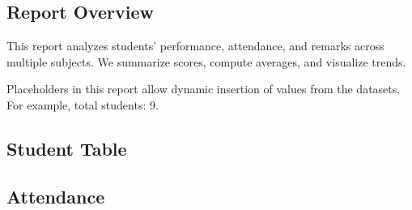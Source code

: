 \documentclass[11pt]{report}
\begin{document}
\chapter{}

\section{Report Overview}

This report analyzes students' performance, attendance, and remarks across multiple subjects. We summarize scores, compute averages, and visualize trends.

Placeholders in this report allow dynamic insertion of values from the datasets. For example, total students: 9.

\section{Student Table}

\begin{table}[H]
    \centering
\end{table}

\section{Attendance}

\begin{table}[H]
    \centering
\end{table}
\end{document}
